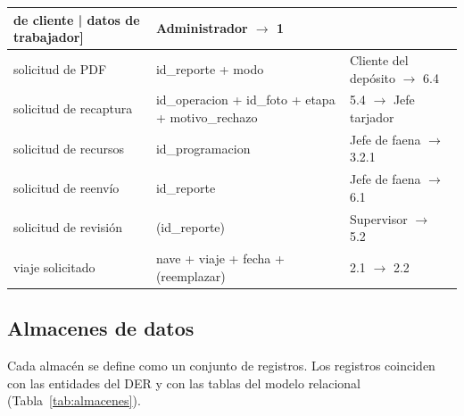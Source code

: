 {\begin{longtable}{|L{3.4cm}|L{7.2cm}|L{4.0cm}|}
de cliente | datos de trabajador] & Administrador $\rightarrow$ 1 \\ \hline
solicitud de PDF & id\_reporte + modo & Cliente del depósito $\rightarrow$
6.4 \\ \hline
solicitud de recaptura & id\_operacion + id\_foto + etapa + motivo\_rechazo & 5.4
$\rightarrow$ Jefe tarjador \\ \hline
solicitud de recursos & id\_programacion & Jefe de faena $\rightarrow$ 3.2.1 \\ \hline
solicitud de reenvío & id\_reporte & Jefe de faena $\rightarrow$ 6.1 \\ \hline
solicitud de revisión & (id\_reporte) & Supervisor $\rightarrow$ 5.2 \\ \hline
viaje solicitado & nave + viaje + fecha + (reemplazar) & 2.1 $\rightarrow$ 2.2 \\ \hline
\end{longtable}
}

\subsection{Almacenes de datos}

Cada almacén se define como un conjunto de registros. Los registros coinciden con las
entidades del DER y con las tablas del modelo relacional (Tabla~\ref{tab:almacenes}).

